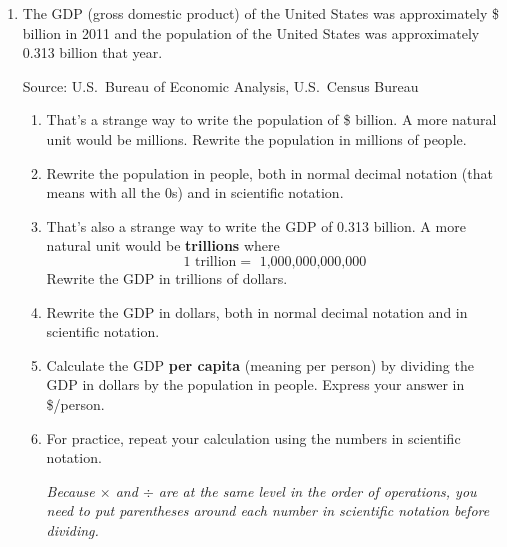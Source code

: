 \begin{enumerate}
\item The GDP (gross domestic product) of the United States was approximately \$ billion in 2011 and the population of the United States was approximately 0.313 billion that year.  \hfill \begin{footnotesize} Source:  U.S.\ Bureau of Economic Analysis, U.S.\ Census Bureau\end{footnotesize}
\begin{enumerate}
\item That's a strange way to write the population of \$ billion.  A more natural unit would be millions.  Rewrite the population in millions of people. \vfill
\item Rewrite the population in people, both in normal decimal notation (that means with all the 0s) and in scientific notation. \vfill
\item That's also a strange way to write the GDP of  0.313 billion.   A more natural unit would be \textbf{trillions} where
$$1 \text{ trillion} =  \text{ 1,000,000,000,000}$$
Rewrite the GDP in trillions of dollars. \vfill
\item Rewrite the GDP in dollars, both in normal decimal notation and in scientific notation. \vfill
\item Calculate the GDP \textbf{per capita} (meaning per person) by dividing the GDP in dollars by the population in people.  Express your answer in \$/person. \vfill
\item For practice, repeat your calculation using the numbers in scientific notation.  
 
 \emph{Because $\times$ and $\div$ are at the same level in the order of operations, you need to put parentheses around each number in scientific notation before dividing.} \vfill
\end{enumerate}

\end{enumerate} 

